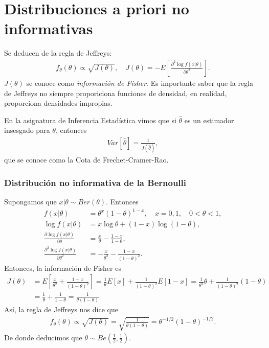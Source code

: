 \section{Distribuciones a priori no informativas}
\noindent Se deducen de la regla de Jeffreys:
\begin{align*}
    f_{\theta}(\theta) \propto \sqrt{J(\theta)}, \quad J(\theta) = - E \left[ \frac{\partial^2 \log f(x | \theta)}{\partial \theta^2} \right].
\end{align*}
$J(\theta)$ se conoce como \textit{información de Fisher}. Es importante saber que la regla de Jeffreys no siempre proporiciona funciones de densidad, en realidad, proporciona densidades impropias. 
\begin{obs}
    En la asignatura de Inferencia Estadística vimos que si $\widehat{\theta}$ es un estimador insesgado para $\theta$, entonces
    \begin{align*}
        Var[ \widehat{\theta}] = \frac{1}{J( \widehat{\theta})},
    \end{align*}
    que se conoce como la Cota de Frechet-Cramer-Rao.
\end{obs}

\subsubsection{Distribución no informativa de la Bernoulli}
\noindent Supongamos que $x | \theta \sim Ber(\theta)$. Entonces 
\begin{align*}
    f(x | \theta) &= \theta^x(1-\theta)^{1-x}, \quad x=0,1, \quad 0 < \theta < 1, \\
     \log f(x | \theta) &= x \log \theta + (1 - x) \log (1 -\theta), \\
     \frac{\partial \log f(x | \theta)}{\partial \theta} &= \frac{x}{\theta} - \frac{1-x}{1-\theta}, \\
     \frac{\partial^2 \log f(x | \theta)}{\partial \theta^2} &= - \frac{x}{\theta^2} - \frac{1-x}{(1-\theta)^2}.
\end{align*}
Entonces, la información de Fisher es
\begin{align*}
    J(\theta) &= E \left[ \frac{x}{\theta^2} + \frac{1-x}{(1-\theta)^2}\right] = \frac{1}{\theta} E[x] + \frac{1}{(1-\theta)^2}E[1-x] = \frac{1}{\theta^2}\theta + \frac{1}{(1-\theta)^2}(1-\theta) \\
    &= \frac{1}{\theta} + \frac{1}{1-\theta} = \frac{1}{\theta(1-\theta)}
\end{align*}
Así, la regla de Jeffreys nos dice que
\begin{align*}
    f_{\theta}(\theta) \propto \sqrt{J(\theta)} = \sqrt{\frac{1}{\theta(1-\theta)}} = \theta^{-1/2}(1-\theta)^{-1/2}.
\end{align*}
De donde deducimos que $\theta \sim Be\left( \frac{1}{2}, \frac{1}{2} \right)$.

